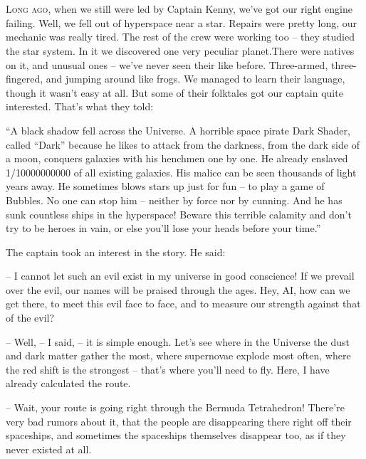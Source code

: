 \documentclass[ebook,oneside,final,openright]{memoir}
\begin{document}
\chapter{}
\par
\lettrine{L}{ong ago,} when we still were led by Captain Kenny, we’ve got our right engine failing. Well, we fell out of hyperspace near a star. Repairs were pretty long, our mechanic was really tired. The rest of the crew were working too – they studied the star system. In it we discovered one very peculiar planet.There were natives on it, and unusual ones – we’ve never seen their like before. Three-armed, three-fingered, and jumping around like frogs. We managed to learn their language, though it wasn’t easy at all. But some of their folktales got our captain quite interested. That’s what they told:\par
\par
“A black shadow fell across the Universe. A horrible space pirate Dark Shader, called “Dark” because he likes to attack from the darkness, from the dark side of a moon, conquers galaxies with his henchmen one by one. He already enslaved 1/10000000000 of all existing galaxies. His malice can be seen thousands of light years away. He sometimes blows stars up just for fun – to play a game of Bubbles. No one can stop him – neither by force nor by cunning. And he has sunk countless ships in the hyperspace! Beware this terrible calamity and don’t try to be heroes in vain, or else you’ll lose your heads before your time.”\par
\par
The captain took an interest in the story. He said:\par
– I cannot let such an evil exist in my universe in good conscience! If we prevail over the evil, our names will be praised through the ages. Hey, AI, how can we get there, to meet this evil face to face, and to measure our strength against that of the evil?\par
– Well, – I said, – it is simple enough. Let’s see where in the Universe the dust and dark matter gather the most, where supernovae explode most often, where the red shift is the strongest – that’s where you’ll need to fly. Here, I have already calculated the route.\par
– Wait, your route is going right through the Bermuda Tetrahedron! There’re very bad rumors about it, that the people are disappearing there right off their spaceships, and sometimes the spaceships themselves disappear too, as if they never existed at all.\par
\end{document}
